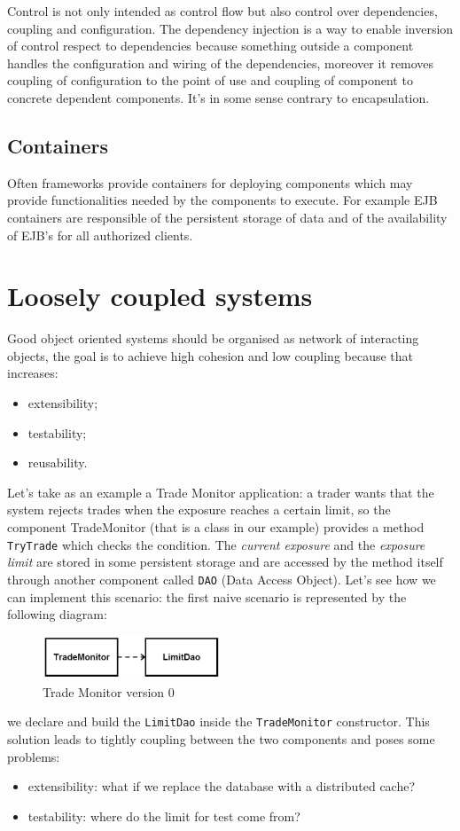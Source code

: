 Control is not only intended as control flow but also control over dependencies, coupling and configuration.
The dependency injection is a way to enable inversion of control respect to dependencies because something outside a component handles the configuration and wiring of the dependencies, moreover it removes coupling of configuration to the point of use and coupling of component to concrete dependent components.
It's in some sense contrary to encapsulation.

\subsection{Containers}
Often frameworks provide containers for deploying components which may provide functionalities needed by the components to execute.
For example EJB containers are responsible of the persistent storage of data and of the availability of EJB's for all authorized clients.

\section{Loosely coupled systems}
Good object oriented systems should be organised as network of interacting objects, the goal is to achieve high cohesion and low coupling because that increases:
\begin{itemize}
    \item extensibility;
    \item testability;
    \item reusability.
\end{itemize}

Let's take as an example a Trade Monitor application: a trader wants that the system rejects trades when the exposure reaches a certain limit, so the component TradeMonitor (that is a class in our example) provides a method \verb|TryTrade| which checks the condition.
The \emph{current exposure} and the \emph{exposure limit} are stored in some persistent storage and are accessed by the method itself through another component called \verb|DAO| (Data Access Object).
Let's see how we can implement this scenario: the first naive scenario is represented by the following diagram:
\begin{figure}[H]
    \centering
    \includegraphics[width=200px]{images/9_Frameworks/trade_monitor_0.png}
    \caption{Trade Monitor version 0}
\end{figure}
we declare and build the \verb|LimitDao| inside the \verb|TradeMonitor| constructor.
This solution leads to tightly coupling between the two components and poses some problems:
\begin{itemize}
    \item extensibility: what if we replace the database with a distributed cache?
    \item testability: where do the limit for test come from?
\end{itemize}

